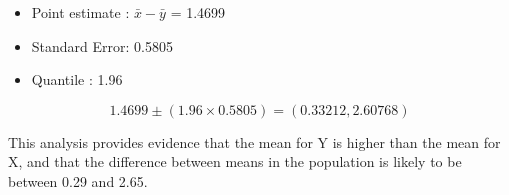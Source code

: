 \documentclass[a4]{beamer}
\begin{document}
\begin{frame}
\begin{itemize}
\item Point estimate : $\bar{x} - \bar{y}$ = 1.4699
\item Standard Error: 0.5805
\item Quantile : 1.96
\end{itemize}

\[ 1.4699  \pm (1.96 \times 0.5805) = (0.33212,2.60768) \]


This analysis provides evidence that the mean for Y is higher than the mean for X, 
and that the difference between means in the population is likely to be between 0.29 and 2.65.


\end{frame}
\end{document}
